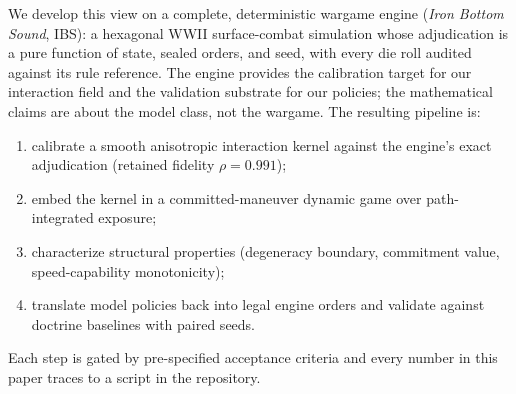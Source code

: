\documentclass[12pt,a4paper]{article}
\begin{document}
We develop this view on a complete, deterministic wargame engine
(\emph{Iron Bottom Sound}, IBS): a hexagonal WWII surface-combat simulation
whose adjudication is a pure function of state, sealed orders, and seed, with
every die roll audited against its rule reference.  The engine provides the
calibration target for our interaction field and the validation substrate for
our policies; the mathematical claims are about the model class, not the
wargame.  The resulting pipeline is:
\begin{enumerate}
\item calibrate a smooth anisotropic interaction kernel against the engine's
exact adjudication (retained fidelity $\rho=0.991$);
\item embed the kernel in a committed-maneuver dynamic game over
path-integrated exposure;
\item characterize structural properties (degeneracy boundary, commitment
value, speed-capability monotonicity);
\item translate model policies back into legal engine orders and validate
against doctrine baselines with paired seeds.
\end{enumerate}
Each step is gated by pre-specified acceptance criteria and every number in
this paper traces to a script in the repository.
\end{document}
